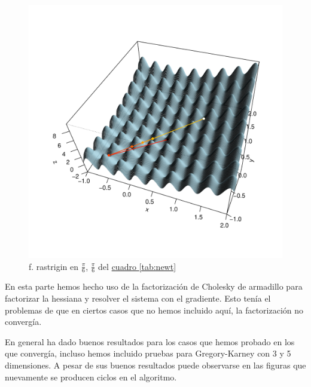 \documentclass[10pt]{article}
\theoremstyle{definition}
\begin{document}
\begin{figure}
\vspace{-4em}%
\hfill%
\hspace{-6ex}\includegraphics[width=0.9\linewidth]{../graphs/rastrigin_func/newt_0.34/plot1.pdf}
\hfill\hbox{}
\vspace{-3.5em}
\caption{\small f. rastrigin en $\frac{\pi}{6}$, $\frac{\pi}{6}$ del \hyperref[tab:newt]{cuadro \ref*{tab:newt}}} \label{fig:steep2}
\vspace{-5.5em}
\end{figure}

En esta parte hemos hecho uso de la factorización de Cholesky de armadillo para factorizar la hessiana y resolver el sistema con el gradiente. Esto tenía el problemas de que en ciertos casos que no hemos incluido aquí, la factorización no convergía.


En general ha dado buenos resultados para los casos que hemos probado en los que convergía, incluso hemos incluido pruebas para Gregory-Karney con 3 y 5 dimensiones. A pesar de sus buenos resultados puede observarse en las figuras que nuevamente se producen ciclos en el algoritmo.
\vspace{2.8em}
\end{document}
